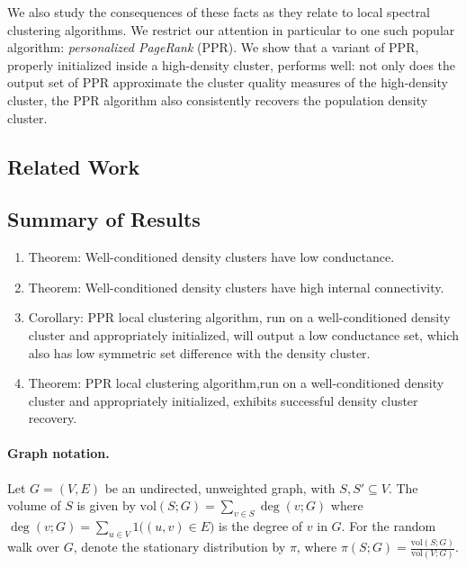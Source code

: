\documentclass{article}
\newcommand{\vol}{\text{vol}}
\theoremstyle{aldenthm}
\theoremstyle{remark}
\begin{document}
We also study the consequences of these facts as they relate to local spectral clustering algorithms. We restrict our attention in particular to one such popular algorithm: \textit{personalized PageRank} (PPR). We show that a variant of PPR, properly initialized inside a high-density cluster, performs well: not only does the output set of PPR approximate the cluster quality measures of the high-density cluster, the PPR algorithm also consistently recovers the population density cluster. 

\subsection{Related Work}



\subsection{Summary of Results}

\begin{enumerate}
	\item 
	Theorem: Well-conditioned density clusters have low conductance.
	
	\item
	Theorem: Well-conditioned density clusters have high internal connectivity.
	
	\item 
	Corollary: PPR local clustering algorithm, run on a well-conditioned density cluster and appropriately initialized, will output a low conductance set, which also has low symmetric set difference with the density cluster.
	
	\item
	Theorem: PPR local clustering algorithm,run on a well-conditioned density cluster and appropriately initialized, exhibits successful density cluster recovery.
\end{enumerate}

\paragraph{Graph notation.}

Let $G = (V,E)$ be an undirected, unweighted graph, with $S,S' \subseteq V$.
The volume of $S$ is given by $\vol(S; G) = \sum_{v \in S} \deg(v; G) $
where $\deg(v; G) = \sum_{u \in V} 1\bigl((u,v) \in E\bigr)$ is the degree of $v$ in $G$. For the random walk over $G$, denote the stationary distribution by $\pi$, where $\pi(S; G) = \frac{\vol(S ; G)}{\vol(V; G)}$. 
\end{document}
